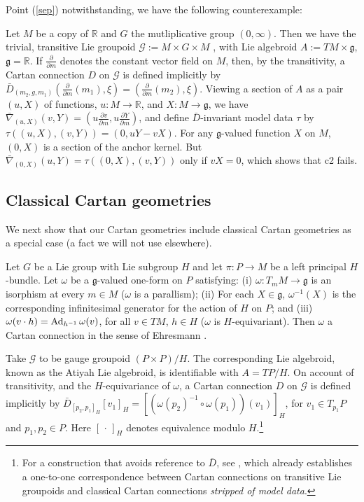 \documentclass[leqno,12pt]{amsart} %
\begin{document}
Point (\ref{sep}) notwithstanding, we have the following counterexample:
\begin{example}
  Let $M$ be a copy of ${\mathbb R} $ and $G$ the mutliplicative group $(0, \infty)$. Then
  we have the trivial, transitive Lie groupoid ${\mathcal G} := M \times G \times M$
  \cite[Example 1.1.7]{Mackenzie_05}, with Lie algebroid $A := TM \times {\mathfrak g} $,
  ${\mathfrak g} = {\mathbb R} $. If $\frac{\partial}{\partial m}$ denotes the constant
  vector field on $M$, then, by the transitivity, a Cartan connection $D$ on
  ${\mathcal G} $ is defined implicitly by
  $\bar D_{(m_2, g, m_1)}(\frac{\partial}{\partial m} (m_1), \xi) =
  (\frac{\partial}{\partial m} (m_2), \xi)$. Viewing a section of $A$ as a pair $(u, X)$
  of functions, $u \colon M \rightarrow {\mathbb R}$, and
  $X \colon M \rightarrow {\mathfrak g}$, we have
  $\bar\nabla_{(u, X)}(v, Y) = (u \frac{\partial v}{\partial m}, u\frac{\partial
    Y}{\partial m})$, and define $\bar D$-invariant model data $\tau $ by
  $\tau((u, X), (v, Y)) = (0, uY - vX)$. For any ${\mathfrak g}$-valued function $X$ on
  $M$, $(0, X)$ is a section of the anchor kernel.  But
  $\bar\nabla_{(0, X)}(u, Y) = \tau((0, X), (v, Y)) $ only if $vX = 0$, which shows
  that c2 fails.
\end{example}

\subsection{Classical Cartan geometries}\label{cartan_geometries_defined}
We next show that our Cartan geometries include classical Cartan geometries as
a special case (a fact we will not use elsewhere).

Let $G$ be a Lie group with Lie subgroup $H$ and let $\pi \colon P \rightarrow M$ be a
left principal $H$-bundle. Let $\omega $ be a ${\mathfrak g}$-valued one-form on $P$
satisfying: (i) $\omega \colon {T_mM} \rightarrow {\mathfrak g}$ is an isorphism at every
$m \in M$ ($\omega $ is a parallism); (ii) For each $X \in {\mathfrak g} $,
$\omega^{-1}(X)$ is the corresponding infinitesimal generator for the action of $H$ on
$P$; and (iii) $\omega(v \cdot h) = \operatorname{Ad}_{h^{-1}} \omega(v)$, for all $v \in TM$,
$h \in H$ ($\omega$ is $H$-equivariant). Then $\omega $ a Cartan connection in the sense
of Ehresmann \cite{Ehresmann_51}.

Take ${\mathcal G} $ to be gauge groupoid $(P \times P)/H$. The corresponding Lie
algebroid, known as the Atiyah Lie algebroid, is identifiable with $A = TP /H$. On account
of transitivity, and the $H$-equivariance of $\omega$, a Cartan connection $D$ on
${\mathcal G} $ is defined implicitly by
$\bar D_{[p_2, p_1]_H}[v_1]_H = [(\omega(p_2)^{-1}\circ\omega(p_1))(v_1)]_H$, for
$v_1 \in T_{p_1}P$ and $p_1, p_2 \in P $. Here $[\,\cdot\,]_H$ denotes equivalence modulo
$H$.\footnote{For a construction that avoids reference to $\bar D$, see \cite{Blaom_16b},
  which already establishes a one-to-one correspondence between Cartan connections on
  transitive Lie groupoids and classical Cartan connections {\em stripped of model data}.}
\end{document}
